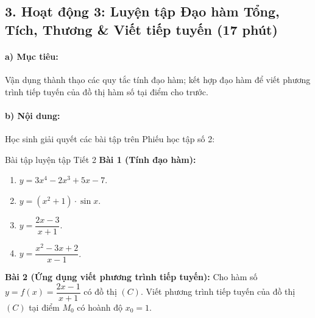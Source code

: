\documentclass[12pt, a4paper]{article}
\begin{document}
\subsection*{3. Hoạt động 3: Luyện tập Đạo hàm Tổng, Tích, Thương & Viết tiếp tuyến (17 phút)}

\paragraph{a) Mục tiêu:} Vận dụng thành thạo các quy tắc tính đạo hàm; kết hợp đạo hàm để viết phương trình tiếp tuyến của đồ thị hàm số tại điểm cho trước.

\paragraph{b) Nội dung:} Học sinh giải quyết các bài tập trên Phiếu học tập số 2:

\begin{pedabox}{Bài tập luyện tập Tiết 2}
\textbf{Bài 1 (Tính đạo hàm):}
\begin{enumerate}[leftmargin=0.6cm]
    \item[a)] $y = 3x^4 - 2x^3 + 5x - 7$.
    \item[b)] $y = (x^2 + 1) \cdot \sin x$.
    \item[c)] $y = \dfrac{2x - 3}{x + 1}$.
    \item[d)] $y = \dfrac{x^2 - 3x + 2}{x - 1}$.
\end{enumerate}

\textbf{Bài 2 (Ứng dụng viết phương trình tiếp tuyến):}
Cho hàm số $y = f(x) = \dfrac{2x - 1}{x + 1}$ có đồ thị $(C)$. Viết phương trình tiếp tuyến của đồ thị $(C)$ tại điểm $M_0$ có hoành độ $x_0 = 1$.
\end{pedabox}
\end{document}
